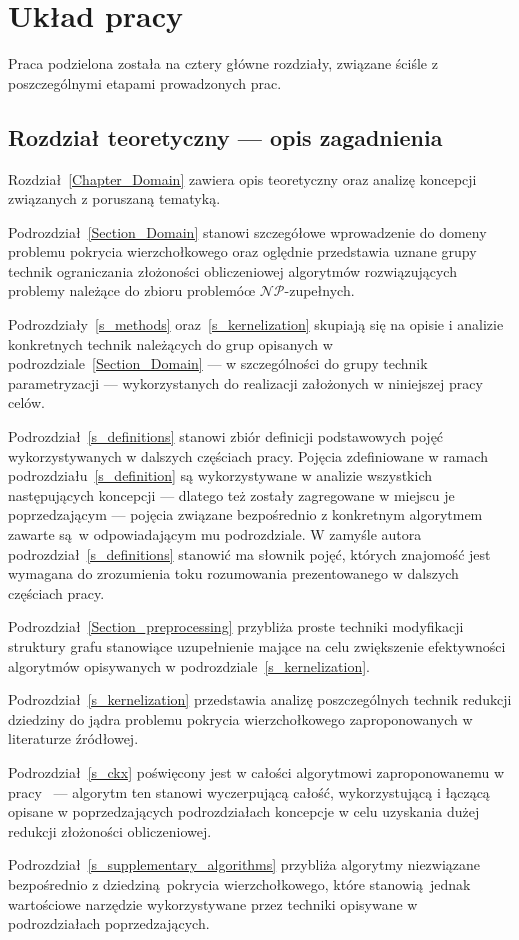 \section{Układ pracy}\label{Section_Layout}
\par{
  Praca podzielona została na cztery główne rozdziały, związane ściśle z poszczególnymi etapami prowadzonych prac.
}
\subsection{Rozdział teoretyczny --- opis zagadnienia}
\par{
  Rozdział~\ref{Chapter_Domain} zawiera opis teoretyczny oraz analizę koncepcji związanych z poruszaną tematyką.

  Podrozdział~\ref{Section_Domain} stanowi szczegółowe wprowadzenie do domeny problemu pokrycia wierzchołkowego oraz oględnie przedstawia uznane grupy technik ograniczania złożoności obliczeniowej algorytmów rozwiązujących problemy należące do zbioru problemóœ $\mathcal{NP}$-zupełnych.

  Podrozdziały~\ref{s_methods} oraz~\ref{s_kernelization} skupiają się na opisie i analizie konkretnych technik należących do grup opisanych w podrozdziale~\ref{Section_Domain} --- w szczególności do grupy technik parametryzacji --- wykorzystanych do realizacji założonych w niniejszej pracy celów.

  Podrozdział~\ref{s_definitions} stanowi zbiór definicji podstawowych pojęć wykorzystywanych w dalszych częściach pracy.
  Pojęcia zdefiniowane w ramach podrozdziału~\ref{s_definition} są wykorzystywane w analizie wszystkich następujących koncepcji --- dlatego też zostały zagregowane w miejscu je poprzedzającym --- pojęcia związane bezpośrednio z konkretnym algorytmem zawarte są w odpowiadającym mu podrozdziale.
  W zamyśle autora podrozdział~\ref{s_definitions} stanowić ma słownik pojęć, których znajomość jest wymagana do zrozumienia toku rozumowania prezentowanego w dalszych częściach pracy.

  Podrozdział~\ref{Section_preprocessing} przybliża proste techniki modyfikacji struktury grafu stanowiące uzupełnienie mające na celu zwiększenie efektywności algorytmów opisywanych w podrozdziale~\ref{s_kernelization}.

  Podrozdział~\ref{s_kernelization} przedstawia analizę poszczególnych technik redukcji dziedziny do jądra problemu pokrycia wierzchołkowego zaproponowanych w literaturze źródłowej.

  Podrozdział~\ref{s_ckx} poświęcony jest w całości algorytmowi zaproponowanemu w pracy~\cite{ImprovedBounds10} --- algorytm ten stanowi wyczerpującą całość, wykorzystującą i łączącą opisane w poprzedzających podrozdziałach koncepcje w celu uzyskania dużej redukcji złożoności obliczeniowej.

  Podrozdział~\ref{s_supplementary_algorithms} przybliża algorytmy niezwiązane bezpośrednio z dziedziną pokrycia wierzchołkowego, które stanowią jednak wartościowe narzędzie wykorzystywane przez techniki opisywane w podrozdziałach poprzedzających.
}
